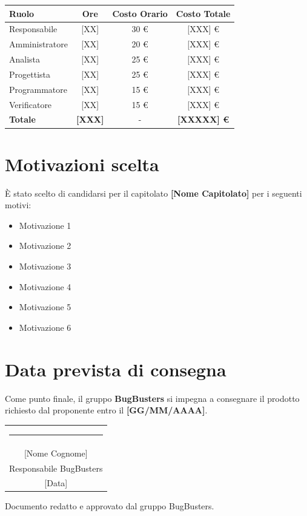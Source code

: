 \documentclass[a4paper,12pt]{article}
\begin{document}
\begin{center}
\begin{tcolorbox}[colback=lightgray,colframe=primaryblue,width=0.9\textwidth,arc=2mm,boxrule=0.5pt]
\begin{center}
\begin{tabular}{lccc}
\toprule
\textbf{Ruolo} & \textbf{Ore} & \textbf{Costo Orario} & \textbf{Costo Totale} \\
\midrule
Responsabile & [XX] & 30 \euro & [XXX] \euro \\
Amministratore & [XX] & 20 \euro & [XXX] \euro \\
Analista & [XX] & 25 \euro & [XXX] \euro \\
Progettista & [XX] & 25 \euro & [XXX] \euro \\
Programmatore & [XX] & 15 \euro & [XXX] \euro \\
Verificatore & [XX] & 15 \euro & [XXX] \euro \\
\midrule
\textbf{Totale} & \textbf{[XXX]} & - & \textbf{[XXXXX] \euro} \\
\bottomrule
\end{tabular}
\end{center}
\end{tcolorbox}
\end{center}

\newpage

\section{Motivazioni scelta}

È stato scelto di candidarsi per il capitolato \textbf{[Nome Capitolato]} per i seguenti motivi:

\begin{itemize}
    \item Motivazione 1
    \item Motivazione 2
    \item Motivazione 3
    \item Motivazione 4
    \item Motivazione 5
    \item Motivazione 6
\end{itemize}

\section{Data prevista di consegna}

Come punto finale, il gruppo \textbf{BugBusters} si impegna a consegnare il prodotto richiesto dal proponente entro il \textbf{[GG/MM/AAAA]}.

\vspace{2cm}

\begin{flushright}
\begin{tabular}{c}
\rule{6cm}{0.4pt} \\
{[Nome Cognome]} \\
Responsabile BugBusters \\[0.3cm]
{[Data]} \\
\end{tabular}
\end{flushright}

\vfill
\begin{center}
    {\small\color{darkgray} Documento redatto e approvato dal gruppo BugBusters.}
\end{center}
\end{document}
